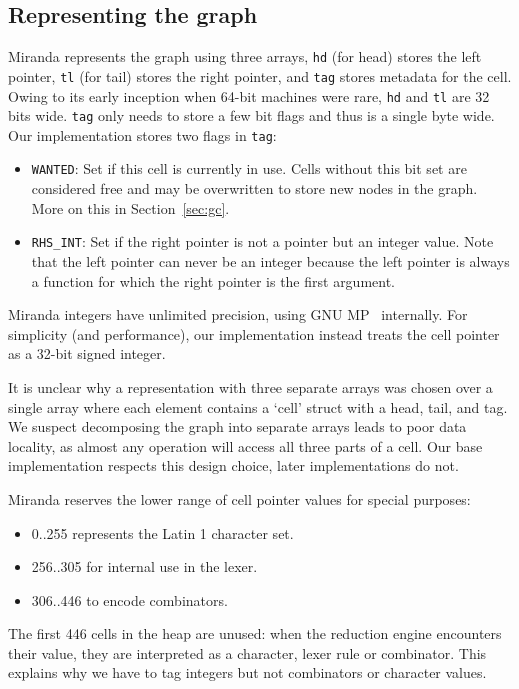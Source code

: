 \documentclass[conference]{IEEEtran}
\begin{document}
\subsection{Representing the graph}
Miranda represents the graph using three arrays, \texttt{hd} (for head) stores the left pointer, \texttt{tl} (for tail) stores the right pointer, and \texttt{tag} stores metadata for the cell.
Owing to its early inception when 64-bit machines were rare, \texttt{hd} and \texttt{tl} are 32 bits wide.
\texttt{tag} only needs to store a few bit flags and thus is a single byte wide.
Our implementation stores two flags in \texttt{tag}:
\begin{itemize}
    \item \texttt{WANTED}: Set if this cell is currently in use. Cells without this bit set are considered free and may be overwritten to store new nodes in the graph. More on this in Section~\ref{sec:gc}.
    \item \texttt{RHS\_INT}: Set if the right pointer is not a pointer but an integer value. Note that the left pointer can never be an integer because the left pointer is always a function for which the right pointer is the first argument.
\end{itemize}

Miranda integers have unlimited precision, using GNU MP~\cite{gnump} internally.
For simplicity (and performance), our implementation instead treats the cell pointer as a 32-bit signed integer.

It is unclear why a representation with three separate arrays was chosen over a single array where each element contains a `cell' struct with a head, tail, and tag.
We suspect decomposing the graph into separate arrays leads to poor data locality, as almost any operation will access all three parts of a cell.
Our base implementation respects this design choice, later implementations do not.

Miranda reserves the lower range of cell pointer values for special purposes:
\begin{itemize}
    \item 0..255 represents the Latin 1 character set.
    \item 256..305 for internal use in the lexer.
    \item 306..446 to encode combinators.
\end{itemize}

The first 446 cells in the heap are unused: when the reduction engine encounters their value, they are interpreted as a character, lexer rule or combinator.
This explains why we have to tag integers but not combinators or character values.
\end{document}
